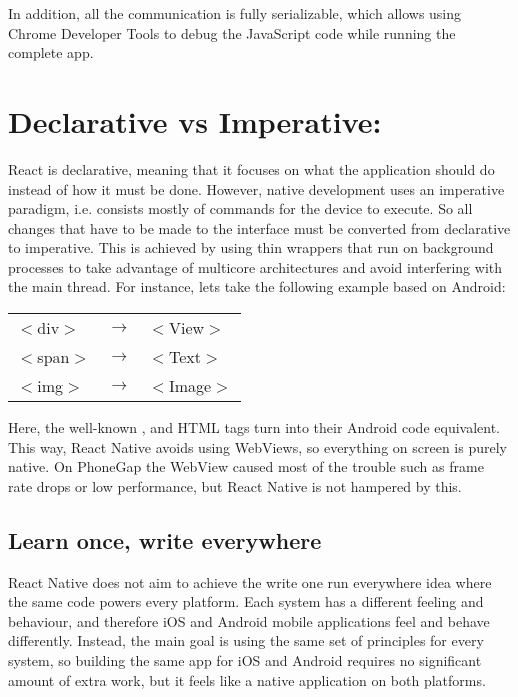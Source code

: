 In addition, all the communication is fully serializable, which allows using Chrome Developer Tools to debug the JavaScript code while running the complete app.

\section{Declarative vs Imperative:} 

React is declarative, meaning that it focuses on what the application should do instead of how it must be done. However, native development uses an imperative paradigm, i.e. consists mostly of commands for the device to execute. So all changes that have to be made to the interface must be converted from declarative to imperative. This is achieved by using thin wrappers that run on background processes to take advantage of multicore architectures and avoid interfering with the main thread. For instance, lets take the following example based on Android:

\begin{table}[H]
\centering
\label{declarative-imperative-example}
\begin{tabular}{lll}
$<$div$>$ & $\rightarrow$ & $<$View$>$  \\
$<$span$>$ & $\rightarrow$ &   $<$Text$>$\\
$<$img$>$  & $\rightarrow$ & $<$Image$>$
\end{tabular}
\end{table}

Here, the well-known ,  and  HTML tags turn into their Android code equivalent. This way, React Native avoids using WebViews, so everything on screen is purely native. On PhoneGap the WebView caused most of the trouble such as frame rate drops or low performance, but React Native is not hampered by this.

\subsection{Learn once, write everywhere}

React Native does not aim to achieve the write one run everywhere idea where the same code powers every platform. Each system has a different feeling and behaviour, and therefore iOS and Android mobile applications feel and behave differently. Instead, the main goal is using the same set of principles for every system, so building the same app for iOS and Android requires no significant amount of extra work, but it feels like a native application on both platforms.

